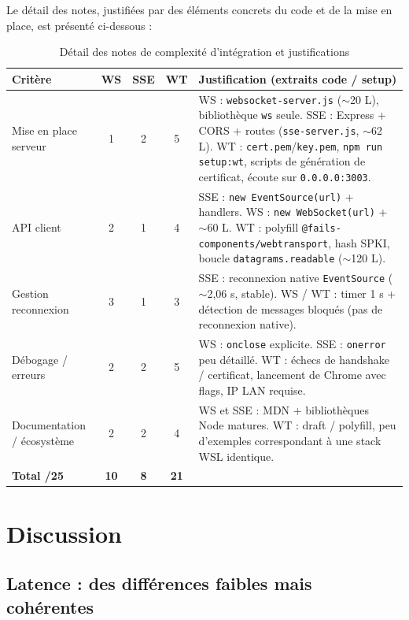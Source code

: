 Le détail des notes, justifiées par des éléments concrets du code et de la mise en place, est présenté ci-dessous :

\begin{table}[H]
\centering
\footnotesize
\begin{tabular}{|p{2cm}|c|c|c|p{8cm}|}
\hline
\textbf{Critère} & \textbf{WS} & \textbf{SSE} & \textbf{WT} & \textbf{Justification (extraits code / setup)} \\
\hline
Mise en place serveur & 1 & 2 & 5 & WS : \texttt{websocket-server.js} ($\sim$20 L), bibliothèque \texttt{ws} seule. SSE : Express + CORS + routes (\texttt{sse-server.js}, $\sim$62 L). WT : \texttt{cert.pem}/\texttt{key.pem}, \texttt{npm run setup:wt}, scripts de génération de certificat, écoute sur \texttt{0.0.0.0:3003}. \\
\hline
API client & 2 & 1 & 4 & SSE : \texttt{new EventSource(url)} + handlers. WS : \texttt{new WebSocket(url)} + $\sim$60 L. WT : polyfill \texttt{@fails-components/}\allowbreak\texttt{webtransport}, hash SPKI, boucle \texttt{datagrams.readable} ($\sim$120 L). \\
\hline
Gestion reconnexion & 3 & 1 & 3 & SSE : reconnexion native \texttt{EventSource} ($\sim$2,06 s, stable). WS / WT : timer 1 s + détection de messages bloqués (pas de reconnexion native). \\
\hline
Débogage / erreurs & 2 & 2 & 5 & WS : \texttt{onclose} explicite. SSE : \texttt{onerror} peu détaillé. WT : échecs de handshake / certificat, lancement de Chrome avec flags, IP LAN requise. \\
\hline
Documentation / écosystème & 2 & 2 & 4 & WS et SSE : MDN + bibliothèques Node matures. WT : draft / polyfill, peu d'exemples correspondant à une stack WSL identique. \\
\hline
\textbf{Total /25} & \textbf{10} & \textbf{8} & \textbf{21} & \\
\hline
\end{tabular}
\caption{Détail des notes de complexité d'intégration et justifications}
\end{table}

\section{Discussion}

\subsection{Latence : des différences faibles mais cohérentes}

